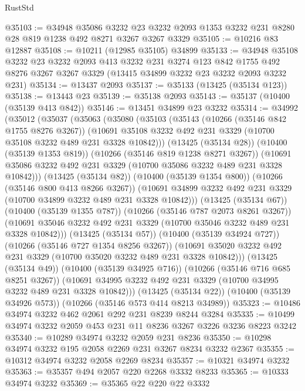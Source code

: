 \begin{lexlean}{RustStd}
\begin{coremodule}
@35103 := @34948
    @35086
    @3232
    @23
    @3232
    @2093
    @1353
    @3232
    @231
    @8280
    @28
    @819
    @1238
    @492
    @8271
    @3267
    @3267
    @3329
@35105 := @10216 @83 @12887
@35108 := @10211 (@12985 @35105) @34899
@35133 := @34948
    @35108
    @3232
    @23
    @3232
    @2093
    @413
    @3232
    @231
    @3274
    @123
    @842
    @1755
    @492
    @8276
    @3267
    @3267
    @3329
    (@13415 @34899 @3232 @23 @3232 @2093 @3232 @231)
@35134 := @13437 @2093
@35137 := @35133 (@13425 (@35134 @123))
@35138 := @13443 @23
@35139 := @35138 @2093
@35143 := @35137 (@10400 (@35139 @413 @842))
@35146 := @13451 @34899 @23 @3232
@35314 := @34992
    (@35012
      (@35037
        (@35063
          (@35080
            (@35103
              (@35143
                (@10266 (@35146 @842 @1755 @8276 @3267))
                (@10691 @35108 @3232 @492 @231 @3329 (@10700 @35108 @3232 @489 @231 @3328 @10842)))
              (@13425 (@35134 @28))
              (@10400 (@35139 @1353 @819))
              (@10266 (@35146 @819 @1238 @8271 @3267))
              (@10691 @35086 @3232 @492 @231 @3329 (@10700 @35086 @3232 @489 @231 @3328 @10842)))
            (@13425 (@35134 @82))
            (@10400 (@35139 @1354 @800))
            (@10266 (@35146 @800 @413 @8266 @3267))
            (@10691 @34899 @3232 @492 @231 @3329 (@10700 @34899 @3232 @489 @231 @3328 @10842)))
          (@13425 (@35134 @67))
          (@10400 (@35139 @1355 @787))
          (@10266 (@35146 @787 @2073 @8261 @3267))
          (@10691 @35046 @3232 @492 @231 @3329 (@10700 @35046 @3232 @489 @231 @3328 @10842)))
        (@13425 (@35134 @57))
        (@10400 (@35139 @34924 @727))
        (@10266 (@35146 @727 @1354 @8256 @3267))
        (@10691 @35020 @3232 @492 @231 @3329 (@10700 @35020 @3232 @489 @231 @3328 @10842)))
      (@13425 (@35134 @49))
      (@10400 (@35139 @34925 @716))
      (@10266 (@35146 @716 @685 @8251 @3267))
      (@10691 @34995 @3232 @492 @231 @3329 (@10700 @34995 @3232 @489 @231 @3328 @10842)))
    (@13425 (@35134 @22))
    (@10400 (@35139 @34926 @573))
    (@10266 (@35146 @573 @414 @8213 @34989))
@35323 := @10486 @34974 @3232 @462 @2061 @292 @231 @8239 @8244 @3284
@35335 := @10499 @34974 @3232 @2059 @453 @231 @11 @8236 @3267 @3226 @3236 @8223 @3242
@35340 := @10289 @34974 @3232 @2059 @231 @8236
@35350 := @10298 @34974 @3232 @195 @2058 @2269 @231 @3267 @8234 @3232 @2367
@35355 := @10312 @34974 @3232 @2058 @2269 @8234
@35357 := @10321 @34974 @3232
@35363 := @35357 @494 @2057 @220 @2268 @3332 @8233
@35365 := @10333 @34974 @3232
@35369 := @35365 @22 @220 @22 @3332

\end{coremodule}
\end{lexlean}
